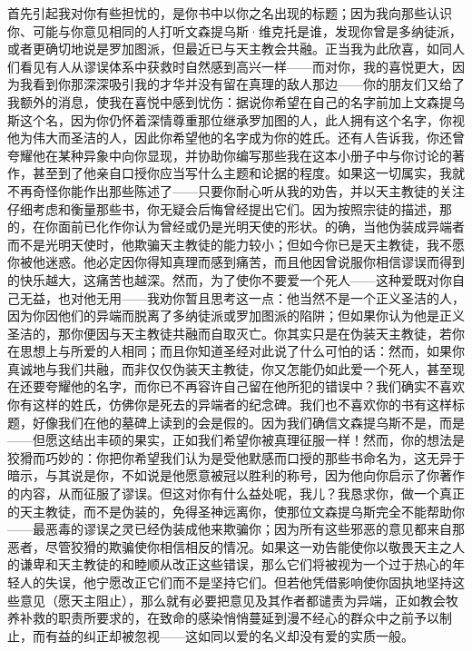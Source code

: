 首先引起我对你有些担忧的，是你书中以你之名出现的标题；因为我向那些认识你、可能与你意见相同的人打听文森提乌斯·维克托是谁，发现你曾是多纳徒派，或者更确切地说是罗加图派，但最近已与天主教会共融。正当我为此欣喜，如同人们看见有人从谬误体系中获救时自然感到高兴一样——而对你，我的喜悦更大，因为我看到你那深深吸引我的才华并没有留在真理的敌人那边——你的朋友们又给了我额外的消息，使我在喜悦中感到忧伤：据说你希望在自己的名字前加上文森提乌斯这个名，因为你仍怀着深情尊重那位继承罗加图的人，此人拥有这个名字，你视他为伟大而圣洁的人，因此你希望他的名字成为你的姓氏。还有人告诉我，你还曾夸耀他在某种异象中向你显现，并协助你编写那些我在这本小册子中与你讨论的著作，甚至到了他亲自口授你应当写什么主题和论据的程度。如果这一切属实，我就不再奇怪你能作出那些陈述了——只要你耐心听从我的劝告，并以天主教徒的关注仔细考虑和衡量那些书，你无疑会后悔曾经提出它们。因为按照宗徒的描述，那的，在你面前已化作你认为曾经或仍是光明天使的形状。的确，当他伪装成异端者而不是光明天使时，他欺骗天主教徒的能力较小；但如今你已是天主教徒，我不愿你被他迷惑。他必定因你得知真理而感到痛苦，而且他因曾说服你相信谬误而得到的快乐越大，这痛苦也越深。然而，为了使你不要爱一个死人——这种爱既对你自己无益，也对他无用——我劝你暂且思考这一点：他当然不是一个正义圣洁的人，因为你因他们的异端而脱离了多纳徒派或罗加图派的陷阱；但如果你认为他是正义圣洁的，那你便因与天主教徒共融而自取灭亡。你其实只是在伪装天主教徒，若你在思想上与所爱的人相同；而且你知道圣经对此说了什么可怕的话：然而，如果你真诚地与我们共融，而非仅仅伪装天主教徒，你又怎能仍如此爱一个死人，甚至现在还要夸耀他的名字，而你已不再容许自己留在他所犯的错误中？我们确实不喜欢你有这样的姓氏，仿佛你是死去的异端者的纪念碑。我们也不喜欢你的书有这样标题，好像我们在他的墓碑上读到的会是假的。因为我们确信文森提乌斯不是，而是——但愿这结出丰硕的果实，正如我们希望你被真理征服一样！然而，你的想法是狡猾而巧妙的：你把你希望我们认为是受他默感而口授的那些书命名为，这无异于暗示，与其说是你，不如说是他愿意被冠以胜利的称号，因为他向你启示了你著作的内容，从而征服了谬误。但这对你有什么益处呢，我儿？我恳求你，做一个真正的天主教徒，而不是伪装的，免得圣神远离你，使那位文森提乌斯完全不能帮助你——最恶毒的谬误之灵已经伪装成他来欺骗你；因为所有这些邪恶的意见都来自那恶者，尽管狡猾的欺骗使你相信相反的情况。如果这一劝告能使你以敬畏天主之人的谦卑和天主教徒的和睦顺从改正这些错误，那么它们将被视为一个过于热心的年轻人的失误，他宁愿改正它们而不是坚持它们。但若他凭借影响使你固执地坚持这些意见（愿天主阻止），那么就有必要把意见及其作者都谴责为异端，正如教会牧养补救的职责所要求的，在致命的感染悄悄蔓延到漫不经心的群众中之前予以制止，而有益的纠正却被忽视——这如同以爱的名义却没有爱的实质一般。\par

